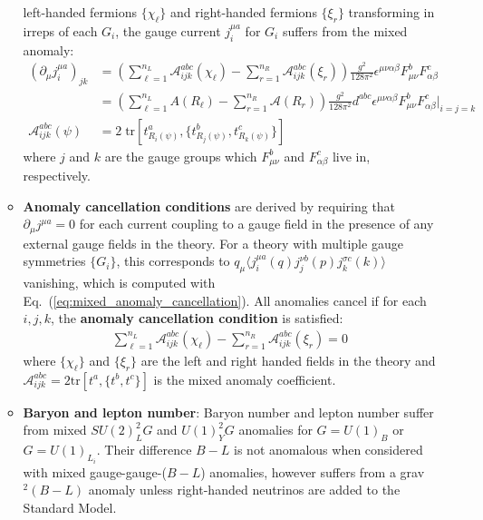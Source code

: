 \documentclass[11pt, oneside]{article}   	%
\theoremstyle{definition}
\numberwithin{equation}{subsection}		%
\begin{document}
\begin{itemize}
\begin{itemize}
		left-handed fermions $\{\chi_\ell\}$ and right-handed fermions $\{\xi_r\}$ transforming in irreps of each $G_i$, the gauge current 
		$j_i^{\mu a}$ for $G_i$ suffers from the mixed anomaly:
		\begin{align}
			\left(\partial_\mu j_i^{\mu a}\right)_{jk} &= \left(\sum_{\ell = 1}^{n_L} \mathcal A_{ijk}^{abc}(\chi_\ell) - \sum_{r = 1}^{n_R} \mathcal A_{ijk}^{abc}(\xi_r)\right)
			\frac{g^2}{128\pi^2} \epsilon^{\mu\nu\alpha\beta}F_{\mu\nu}^b F_{\alpha\beta}^c \\
			&= \left(\sum_{\ell = 1}^{n_L} A(R_\ell) - \sum_{r = 1}^{n_R} \mathcal A(R_r)\right)
			\frac{g^2}{128\pi^2} d^{abc} \epsilon^{\mu\nu\alpha\beta}F_{\mu\nu}^b F_{\alpha\beta}^c\bigg|_{i = j = k} \\
			\mathcal A_{ijk}^{abc}(\psi) &= 2\;\mathrm{tr}\left[t^a_{R_i(\psi)}, \{t^b_{R_j(\psi)}, t^c_{R_k(\psi)}\}\right]
		\end{align}
		where $j$ and $k$ are the gauge groups which $F_{\mu\nu}^b$ and $F_{\alpha\beta}^c$ live in, respectively.
		\item \textbf{Anomaly cancellation conditions} are derived by requiring that $\partial_\mu j^{\mu a} = 0$ for each current coupling 
		to a gauge field in the presence of any external gauge fields in the theory. For a theory with multiple gauge symmetries $\{G_i\}$, 
		this corresponds to $q_\mu \langle j_i^{\mu a}(q) j_j^{\nu b}(p) j_k^{\sigma c}(k)\rangle$ vanishing, which is computed with 
		Eq.~(\ref{eq:mixed_anomaly_cancellation}). All anomalies cancel if for each $i, j, k$, the \textbf{anomaly cancellation condition} is 
		satisfied:
			\begin{align}
				\sum_{\ell = 1}^{n_L} \mathcal A_{ijk}^{abc}(\chi_\ell) - \sum_{r = 1}^{n_R} \mathcal A_{ijk}^{abc}(\xi_r) = 0 
			\end{align}
		where $\{\chi_\ell\}$ and $\{\xi_r\}$ are the left and right handed fields in the theory and $\mathcal A_{ijk}^{abc} = 2\mathrm{tr}[t^a, \{t^b, t^c\}]$ is 
		the mixed anomaly coefficient.
		\item \textbf{Baryon and lepton number}: Baryon number and lepton number suffer from mixed $SU(2)_L^2 G$ and $U(1)_Y^2 G$ 
		anomalies for $G = U(1)_B$ or $G = U(1)_{L_i}$. Their difference $B - L$ is not anomalous when considered with mixed 
		gauge-gauge-($B - L$) anomalies, however suffers from a grav$^2 (B - L)$ anomaly unless right-handed neutrinos are added to 
		the Standard Model.
	\end{itemize}
	

\end{itemize}
\end{document}
